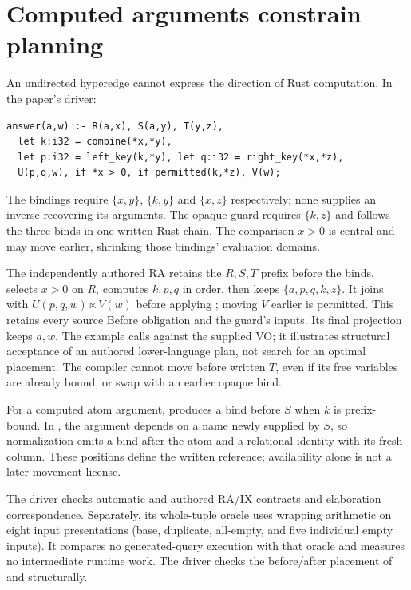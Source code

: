 \section{Computed arguments constrain planning}
\label{sec:constraint-planning}
An undirected hyperedge cannot express the direction of Rust computation.
In the paper's  driver:
\begin{lstlisting}
answer(a,w) :- R(a,x), S(a,y), T(y,z),
  let k:i32 = combine(*x,*y),
  let p:i32 = left_key(k,*y), let q:i32 = right_key(*x,*z),
  U(p,q,w), if *x > 0, if permitted(k,*z), V(w);
\end{lstlisting}
The bindings require $\{x,y\}$, $\{k,y\}$ and $\{x,z\}$ respectively;
none supplies an inverse recovering its arguments. The opaque
 guard requires $\{k,z\}$ and follows the three binds in
one written Rust chain. The comparison $x>0$ is central and may move earlier,
shrinking those bindings' evaluation domains.

The independently authored RA retains the $R,S,T$ prefix before the binds,
selects $x>0$ on $R$, computes $k,p,q$ in order, then keeps
$\{a,p,q,k,z\}$. It joins with $U(p,q,w)\ltimes V(w)$ before applying
; moving $V$ earlier is permitted. This retains every source
Before obligation and the guard's inputs. Its final projection keeps $a,w$.
The example calls  against the supplied VO; it
illustrates structural acceptance of an authored lower-language plan, not
search for an optimal placement. The compiler cannot move 
before written $T$, even if its free variables are already bound, or swap
 with an earlier opaque bind.

For a computed atom argument,  produces a bind before $S$
when $k$ is prefix-bound. In , the argument depends on a
name newly supplied by $S$, so normalization emits a bind after the atom and
a relational identity with its fresh column. These positions define the
written reference; availability alone is not a later movement license.

The driver checks automatic and authored RA/IX contracts and elaboration
correspondence. Separately, its whole-tuple oracle uses wrapping arithmetic
on eight input presentations (base, duplicate, all-empty, and five individual
empty inputs). It compares no generated-query execution with that oracle and
measures no intermediate runtime work. The  driver
checks the before/after placement of  and  structurally.
